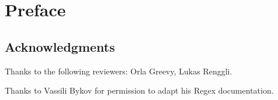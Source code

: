 \documentclass[a4paper,10pt,twoside]{book}
\begin{document}
	\sloppy
	\frontmatter
\fi
\chapter{Preface}\label{cha:intro}



\section*{Acknowledgments}






Thanks to the following reviewers:
Orla Greevy,
Lukas Renggli.

Thanks to Vassili Bykov for permission to adapt his Regex documentation.

\ifx\wholebook\relax\else
   
   
\end{document}
